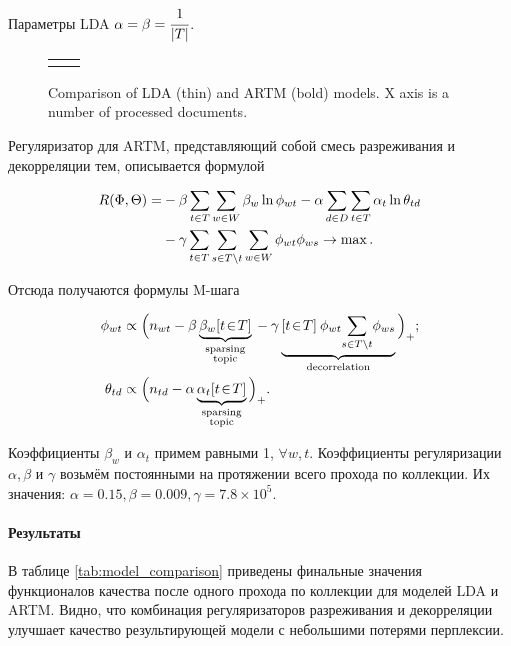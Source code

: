 \documentclass{article}
\begin{document}
Параметры LDA $\alpha = \beta = \cfrac{1}{|T|}$.

\begin{figure}[h!]
\begin{tabular}{cc}

&

\end{tabular}
\caption{Comparison of LDA (thin) and ARTM (bold) models. X axis is a number of processed documents.} \label{fig:comparison_plot}
\end{figure}

Регуляризатор для ARTM, представляющий собой смесь разреживания и декорреляции тем, описывается формулой

\begin{align}
    R(\Phi,\Theta)
    =&
    - \beta \sum_{t\in T} \sum_{w\in W} \beta_w \ln \phi_{wt}
    - \alpha \sum_{d\in D} \sum_{t\in T} \alpha_t \ln \theta_{td}
    \notag
\\  {}&
    - \gamma
        \sum_{t\in T}
        \sum_{s\in T\backslash t}
        \sum_{w\in W} \phi_{wt}\phi_{ws}
    \to \max.
\end{align}

Отсюда получаются формулы M-шага

\begin{align}
    \phi_{wt} &\propto
        \Bigl(n_{wt}
            - \beta \underbrace{\beta_{w} [t\!\in\! T]}_{\substack{\text{sparsing}\\\text{topic}}} {}
            - \gamma \underbrace{[t\!\in\! T]\: \phi_{wt} \!\sum_{s\in T\backslash t}\! \phi_{ws}}_{\text{decorrelation}} {}
        \Bigr)_{+};
\\
    \theta_{td} &\propto
        \Bigl(n_{td}
            - \alpha \underbrace{\alpha_{t} [t\!\in\! T]}_{\substack{\text{sparsing}\\\text{topic}}} {}
        \Bigr)_{+}.
\end{align}

Коэффициенты $\beta_w$ и $\alpha_t$ примем равными 1, $\forall w,t$. Коэффициенты регуляризации $\alpha,  \beta$ и $\gamma$ возьмём постоянными на протяжении всего прохода по коллекции. Их значения: $\alpha = 0.15, \beta = 0.009, \gamma = 7.8 \times 10^5$.

\paragraph{Результаты} В таблице \ref{tab:model_comparison} приведены финальные значения функционалов качества после одного прохода по коллекции для моделей LDA и ARTM. Видно, что комбинация регуляризаторов разреживания и декорреляции улучшает качество результирующей модели с небольшими потерями перплексии.
\end{document}
